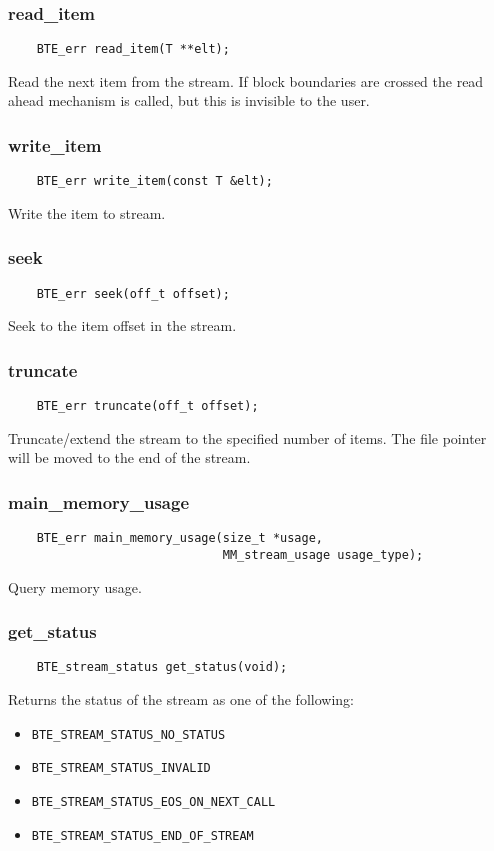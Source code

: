 \subsubsection{read\_item}
\begin{verbatim}
    BTE_err read_item(T **elt);
\end{verbatim}
Read the next item from the stream. If block boundaries are crossed the
read ahead mechanism is called, but this is invisible to the user.

\subsubsection{write\_item}
\begin{verbatim}
    BTE_err write_item(const T &elt);
\end{verbatim}
Write the item to stream.


\subsubsection{seek}
\begin{verbatim}
    BTE_err seek(off_t offset);
\end{verbatim}
Seek to the item offset in the stream.


\subsubsection{truncate}
\begin{verbatim}
    BTE_err truncate(off_t offset);
\end{verbatim}
Truncate/extend the stream to the specified number of items. The file
pointer will be moved to the end of the stream.


\subsubsection{main\_memory\_usage}
\begin{verbatim}
    BTE_err main_memory_usage(size_t *usage,
                              MM_stream_usage usage_type);
\end{verbatim}
Query memory usage.



\subsubsection{get\_status}
\begin{verbatim}
    BTE_stream_status get_status(void);
\end{verbatim}
Returns the status of the stream as one
of the following:
\begin{itemize}
\item \verb|BTE_STREAM_STATUS_NO_STATUS|
\item \verb|BTE_STREAM_STATUS_INVALID|
\item \verb|BTE_STREAM_STATUS_EOS_ON_NEXT_CALL|
\item \verb|BTE_STREAM_STATUS_END_OF_STREAM|
\end{itemize}


